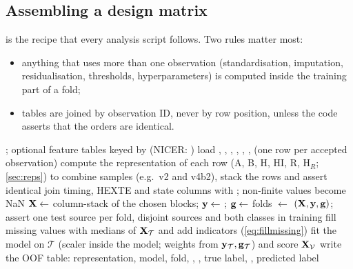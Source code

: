 \subsection{Assembling a design matrix}\label{sec:buildX}
 is the recipe that every analysis script follows. Two rules matter most:
\begin{itemize}
\item anything that uses more than one observation (standardisation, imputation, residualisation, thresholds,
hyperparameters) is computed inside the training part of a fold;
\item tables are joined by observation ID, never by row position, unless the code asserts that the orders are identical.
\end{itemize}

\begin{algorithm}[htbp]
\caption{Building $(\Xm,\yv,\gv)$ and the out-of-fold scores for one analysis.}\label{alg:buildX}
\begin{algorithmic}[1]
\Require {}; optional feature tables keyed by  (NICER: )
\State load , , , , , ,  (one row per accepted observation)
\State compute the representation of each row (A, B, H, HI, R, H$_R$; \cref{sec:reps}) 
\State to combine samples (e.g.\ v2 and v4b2), stack the rows and assert identical 
\State join timing, HEXTE and state columns with ; non-finite values become NaN
\State $\mathbf{X}\gets$ column-stack of the chosen blocks; $\mathbf{y}\gets$ ; $\mathbf{g}\gets$ 
\State folds $\gets$ $(\Xm,\yv,\gv)$; assert one test source per fold, disjoint sources and
both classes in training
  \State fill missing values with medians of $\mathbf{X}_\mathcal T$ and add indicators (\cref{eq:fillmissing})
  \State fit the model on $\mathcal T$ (scaler inside the model; weights from $\mathbf{y}_\mathcal T,\mathbf{g}_\mathcal T$) and score $\mathbf{X}_\mathcal V$
\EndFor
\State write the OOF table: representation, model, fold, , , true label, , predicted label
\end{algorithmic}
\end{algorithm}

